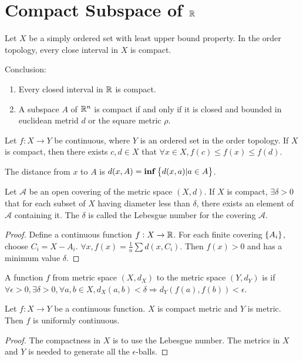 \section{Compact Subspace of $\mathbb{R}$}

\begin{theorem}
    Let $X$ be a simply ordered set with least upper bound property. In the order topology, every close interval in $X$ is compact.    
    
    Conclusion:
    \begin{enumerate}
        \item Every closed interval in $\mathbb{R}$ is compact.
        \item A subspace $A$ of $\mathbb{R}^n$ is compact if and only if it is closed and bounded in euclidean metrid $d$ or the square metric $\rho$.
    \end{enumerate}
\end{theorem}

\begin{theorem}
    Let $f: X \rightarrow Y$ be continuous, where $Y$ is an ordered set in the order topology. If $X$ is compact, then there exists $c,d \in X$ that $\forall x \in X, f(c) \leq f(x) \leq f(d)$.
\end{theorem}

\begin{definition}
    The distance from $x$ to $A$ is $d(x,A) = \mathbf{inf} \set{d(x,a) | a \in A}$.
\end{definition}

\begin{theorem}
    Let $\mathcal{A}$ be an open covering of the metric space $(X, d)$. If $X$ is compact, $\exists \delta > 0$ that for each subset of $X$ having diameter less than $\delta$, there exists an element of $\mathcal{A}$ containing it. The $\delta$ is called the Lebesgue number for the covering $\mathcal{A}$.
\end{theorem}
\begin{proof}
    Define a continuous function $f : X \rightarrow \mathbb{R}$. For each finite covering $\set{A_i}$, choose $C_i = X - A_i$. $\forall x, f(x) = \frac{1}{n} \sum d(x,C_i)$. Then $f(x) > 0$ and has a minimum value $\delta$.
\end{proof}

\begin{definition}
    A function $f$ from metric space $(X, d_X)$ to the metric space $(Y, d_Y)$ is  if $\forall \epsilon > 0, \exists \delta > 0, \forall a,b \in X, d_X (a,b) < \delta \Rightarrow d_Y \left(f(a), f(b)\right) < \epsilon$.
\end{definition}
\begin{theorem}
    Let $f: X \rightarrow Y$ be a continuous function. $X$ is compact metric and $Y$ is metric. Then $f$ is uniformly continuous.    
\end{theorem}
\begin{proof}
    The compactness in $X$ is to use the Lebesgue number. The metrics in $X$ and $Y$ is needed to generate all the $\epsilon$-balls.
\end{proof}



